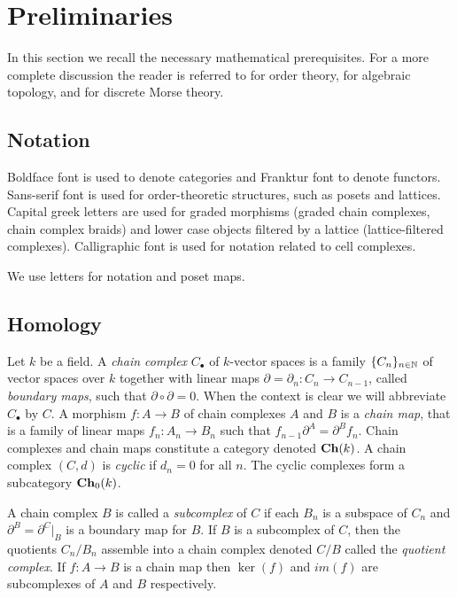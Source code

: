 

\section{Preliminaries}\label{sec:prelims}

In this section we recall  the necessary mathematical prerequisites.   For a more complete discussion the reader is referred to \cite{davey:priestley, roman} for order theory, \cite{lefschetz, gelfand, weibel} for algebraic topology, and \cite{**} for discrete Morse theory.


\subsection{Notation}

Boldface font is used to denote categories and Franktur font to denote functors.  Sans-serif font is used for order-theoretic structures, such as posets and lattices.  Capital greek letters are used for graded morphisms (graded chain complexes, chain complex braids) and lower case objects filtered by a lattice (lattice-filtered complexes).  Calligraphic font is used for notation related to cell complexes.

We use letters for notation and poset maps.

\subsection{Homology}\label{sec:prelims:AT}

Let $k$ be a field.  
A {\em chain complex} $C_\bullet$ of $k$-vector spaces is a family $\{C_n\}_{n\in {\mathbb{N}}}$ of vector spaces over $k$ together with linear maps $\partial=\partial_n \colon C_n\to C_{n-1}$, called \emph{boundary maps}, such that $\partial\circ\partial =0$.  
When the context is clear we will abbreviate $C_\bullet$ by $C$. 
A morphism $f\colon A\to B$ of chain complexes $A$ and $B$ is a {\em chain map}, that is a family of linear maps $f_n \colon A_n\to B_n$ such that $f_{n-1}\partial^A = \partial^B f_n$. 
Chain complexes and chain maps constitute a category denoted ${\bf Ch}(k)$.  A chain complex $(C,d)$ is {\em cyclic} if $d_n=0$ for all $n$.  The cyclic complexes form a subcategory ${\bf Ch}_0(k)$.

A chain complex $B$ is called a {\em subcomplex} of $C$ if each $B_n$ is a subspace of $C_n$ and $\partial^B= \partial^C |_B$ is a boundary map for $B$.    
If $B$ is a subcomplex of $C$, then the quotients $C_n/B_n$ assemble into a chain complex denoted $C/B$ called the {\em quotient complex}.   If $f:A\to B$ is a chain map then $\ker(f)$ and $im(f)$ are subcomplexes of $A$ and $B$ respectively.

